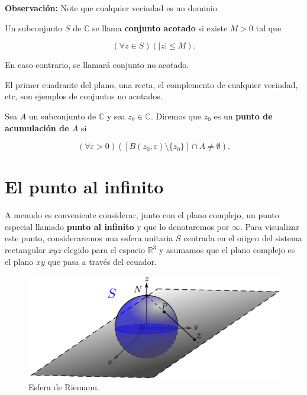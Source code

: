 \textbf{Observación:} Note que cualquier vecindad es un dominio.

\begin{defi}
Un subconjunto $S$ de $\mathbb{C}$ se llama \textbf{conjunto acotado} si existe $M >0$ tal que

$$(\forall z \in S)(|z| \leq M).$$

En caso contrario, se llamará conjunto no acotado.
\end{defi}

\begin{ejemplo}
El primer cuadrante del plano, una recta, el complemento de cualquier vecindad, etc, son ejemplos de conjuntos no acotados.
\end{ejemplo}

\begin{defi}
Sea $A$ un subconjunto de $\mathbb{C}$ y sea $z_0 \in \mathbb{C}$. Diremos que $z_0$ es un \textbf{punto de acumulación de $A$} si

$$(\forall \varepsilon > 0)([B(z_0, \varepsilon) \setminus \{z_0\} ]\cap A \neq \emptyset).$$ 
\end{defi}

\section{El punto al infinito}

A menudo es conveniente considerar, junto con el plano complejo, un punto especial llamado \textbf{punto al infinito} y que lo denotaremos por $\infty$. Para visualizar este punto, consideraremos una esfera unitaria $S$ centrada en el origen del sistema rectangular $xyz$ elegido para el espacio $\mathbb{R}^3$ y asumamos que el plano complejo es el plano $xy$ que pasa a través del ecuador.

\begin{figure}[H]
    \centering
    \includegraphics[scale=0.5]{Figuras/EsferaRiemann.pdf}
    \caption{Esfera de Riemann.}
    \label{EsferaRiemann}
\end{figure}

